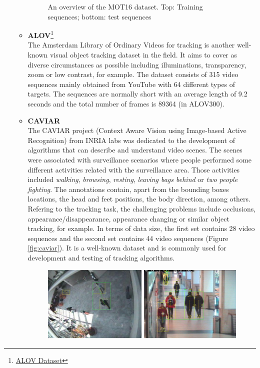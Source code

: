 \documentclass{bmvc2k}
\begin{document}
\begin{itemize}
\begin{itemize}
\begin{figure}[h!]
\begin{center}
\caption{An overview of the MOT16 dataset. Top: Training sequences; bottom: test sequences ~\cite{milan2016mot16}}
\label{fig:mot}
\end{center}
\end{figure}
\item \textbf{ALOV}\footnote{{\href{http://alov300pp.joomlafree.it/dataset-resources.html}{ALOV Dataset}}}\\
The Amsterdam Library of Ordinary Videos for tracking is another well-known visual object tracking dataset in the field. It aims to cover as diverse circumstances as possible including illuminations, transparency, zoom or low contrast, for example. The dataset consists of 315 video sequences mainly obtained from YouTube with 64 different types of targets. The sequences are normally short with an average length of 9.2 seconds and the total number of frames is 89364 (in ALOV300).
\item \textbf{CAVIAR} \cite{dubuisson2016survey}\\
The CAVIAR project (Context Aware Vision using Image-based Active Recognition) from INRIA labs was dedicated to the development of algorithms that can describe and understand video scenes. The scenes were associated with surveillance scenarios where people performed some different activities related with the surveillance area. Those activities included \textit{walking}, \textit{browsing}, \textit{resting}, \textit{leaving bags behind} or \textit{two people fighting}. The annotations contain, apart from the bounding boxes locations, the head and feet positions, the body direction, among others. Refering to the tracking task, the challenging problems include occlusions, appearance/disappearance, appearance changing or similar object tracking, for example. In terms of data size, the first set contains 28 video sequences and the second set contains 44 video sequences (Figure \ref{fig:caviar}). It is a well-known dataset and is commonly used for development and testing of tracking algorithms.
\begin{figure}[h!]
\begin{center}
\includegraphics[scale=0.3]{caviar.png}

\end{center}
\end{figure}
\end{itemize}
\end{itemize}
\end{document}
